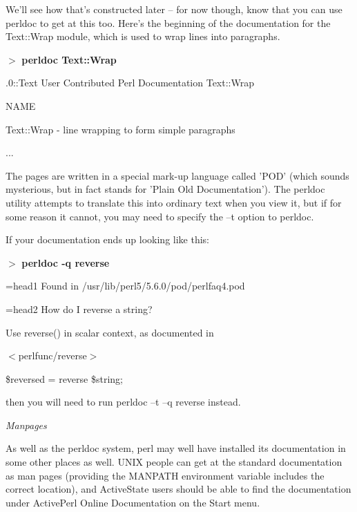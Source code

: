 \documentclass[a4paper,11pt]{book}
\begin{document}
\noindent We'll see how that's constructed later -- for now though, know that you can use perldoc to get at this too. Here's the beginning of the documentation for the Text::Wrap module, which is used to wrap lines into paragraphs.

\noindent 

\noindent $>$ \textbf{perldoc Text::Wrap}

\noindent 

.0::Text  User Contributed Perl Documentation  Text::Wrap

\noindent 

\noindent 

\noindent NAME

\noindent Text::Wrap - line wrapping to form simple paragraphs

\noindent 

\noindent ...

\noindent 

\noindent The pages are written in a special mark-up language called 'POD' (which sounds mysterious, but in fact stands for 'Plain Old Documentation'). The perldoc utility attempts to translate this into ordinary text when you view it, but if for some reason it cannot, you may need to specify the --t option to perldoc.

\noindent If your documentation ends up looking like this:

\noindent 

\noindent 

\noindent $>$ \textbf{perldoc -q reverse}

\noindent =head1 Found in /usr/lib/perl5/5.6.0/pod/perlfaq4.pod

\noindent =head2 How do I reverse a string?

\noindent Use reverse() in scalar context, as documented in

\noindent $<$perlfunc/reverse$>$

\noindent \$reversed = reverse \$string;

\noindent 

\noindent then you will need to run perldoc --t --q reverse instead.

\noindent 

\noindent \textit{Manpages}

\noindent As well as the perldoc system, perl may well have installed its documentation in some other places as well. UNIX people can get at the standard documentation as man pages (providing the MANPATH environment variable includes the correct location), and ActiveState users should be able to find the documentation under ActivePerl \textbar  Online Documentation on the Start menu.
\end{document}
